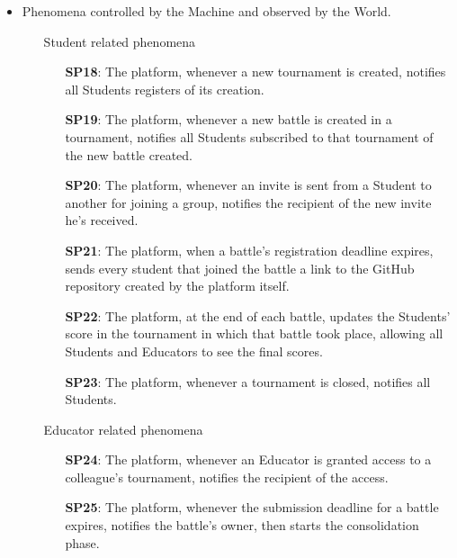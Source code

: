 \documentclass{article}
\begin{document}
\begin{itemize}
    \item Phenomena controlled by the Machine and observed by the World.
          \begin{enumerate}
              \item[\ding{228}] Student related phenomena
                    \begin{enumerate}
                        \item[\textbf{SP18}:] The platform, whenever a new tournament is created, notifies all Students registers of its creation.
                        \item[\textbf{SP19}:] The platform, whenever a new battle is created in a tournament, notifies all Students subscribed to that 
                        tournament of the new battle created.
                        \item[\textbf{SP20}:] The platform, whenever an invite is sent from a Student to another for joining a group, notifies the recipient 
                        of the new invite he's received.
                        \item[\textbf{SP21}:] The platform, when a battle's registration deadline expires, sends every student that
                         joined the battle a link to the GitHub repository created by the platform itself.
                        \item[\textbf{SP22}:] The platform, at the end of each battle, updates the Students' score in the tournament in
                         which that battle took place, allowing all Students and Educators to see the final scores.
                        \item[\textbf{SP23}:] The platform, whenever a tournament is closed, notifies all Students.
                    \end{enumerate}
              \item[\ding{228}] Educator related phenomena
                    \begin{enumerate}
                        \item[\textbf{SP24}:] The platform, whenever an Educator is granted access to a colleague's tournament, notifies the recipient of the access.
                        \item[\textbf{SP25}:] The platform, whenever the submission deadline for a battle expires, notifies the battle's owner, then starts the
                         consolidation phase.
                    \end{enumerate}
          \end{enumerate}
\end{itemize}
\end{document}
